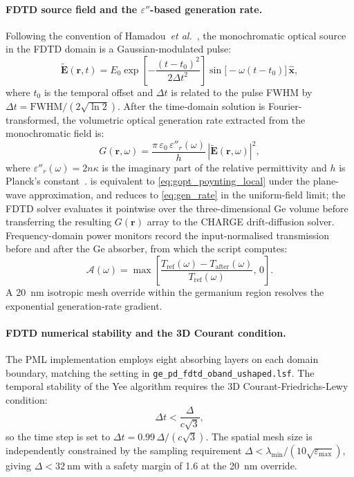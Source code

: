 \paragraph{FDTD source field and the $\varepsilon''$-based generation rate.}
Following the convention of Hamadou~\textit{et al.}~\cite{Hamadou2023}, the
monochromatic optical source in the FDTD domain is a Gaussian-modulated pulse:
\begin{equation}
    \tilde{\mathbf{E}}(\mathbf{r},t)
    = E_0\exp\!\left[-\frac{(t-t_0)^2}{2\Delta t^2}\right]
      \sin\!\bigl[-\omega(t-t_0)\bigr]\,\hat{\mathbf{x}},
    \label{eq:fdtd_source}
\end{equation}
where $t_0$ is the temporal offset and $\Delta t$ is related to the
pulse FWHM by $\Delta t=\mathrm{FWHM}/(2\sqrt{\ln 2})$.
After the time-domain solution is Fourier-transformed, the volumetric
optical generation rate extracted from the monochromatic field is:
\begin{equation}
    G(\mathbf{r},\omega)
    = \frac{\pi\,\varepsilon_0\,\varepsilon''_r(\omega)}{h}
      \,|\tilde{\mathbf{E}}(\mathbf{r},\omega)|^2,
    \label{eq:gen_rate_eps}
\end{equation}
where $\varepsilon''_r(\omega)=2n\kappa$ is the imaginary part of the relative
permittivity and $h$ is Planck's constant~\cite{Hamadou2023}.
 is equivalent to \cref{eq:gopt_poynting_local} under
the plane-wave approximation, and reduces to \cref{eq:gen_rate} in the
uniform-field limit; the FDTD solver evaluates it pointwise over the
three-dimensional Ge volume before transferring the resulting
$G(\mathbf{r})$ array to the CHARGE drift-diffusion solver.
Frequency-domain power monitors record the input-normalised transmission before
and after the Ge absorber, from which the script computes:
\begin{equation}
    \mathcal{A}(\omega)
    = \max\!\left[\frac{T_{\mathrm{ref}}(\omega)-T_{\mathrm{after}}(\omega)}
                        {T_{\mathrm{ref}}(\omega)},\,0\right].
    \label{eq:fdtd_abs}
\end{equation}
A \SI{20}{\nano\metre} isotropic mesh override within the germanium region
resolves the exponential generation-rate gradient.

\paragraph{FDTD numerical stability and the 3D Courant condition.}
The PML implementation employs eight absorbing layers on each domain boundary,
matching the setting in \texttt{ge\_pd\_fdtd\_oband\_ushaped.lsf}. The temporal stability
of the Yee algorithm requires the 3D Courant-Friedrichs-Lewy condition:
\begin{equation}
    \Delta t < \frac{\Delta}{c\sqrt{3}},
    \label{eq:cfl_3d}
\end{equation}
so the time step is set to $\Delta t=0.99\,\Delta/(c\sqrt{3})$. The spatial
mesh size is independently constrained by the sampling requirement
$\Delta<\lambda_{\min}/(10\sqrt{\varepsilon_{\max}})$, giving
$\Delta<\SI{32}{\nano\metre}$ with a safety margin of 1.6 at the
\SI{20}{\nano\metre} override.

